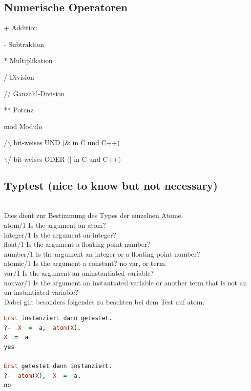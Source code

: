\subsection{Numerische Operatoren}

+     Addition

-     Subtraktion

*     Multiplikation

/     Division    

//    Ganzahl-Division

**    Potenz

mod   Modulo

/$\backslash$    bit-weises UND   (\& in C und C++)

$\backslash$/    bit-weises ODER  (| in C und C++)


\subsection{Typtest (nice to know but not necessary)}\qquad\\
Dies dient zur Bestimmung des Types der einzelnen Atome.\\
atom/1 	Is the argument an atom?\\
integer/1 	Is the argument an integer?\\
float/1 	Is the argument a floating point number?\\
number/1 	Is the argument an integer or a floating point number?\\
atomic/1 	Is the argument a constant? no var, or term. \\
var/1 	Is the argument an uninstantiated variable?\\
nonvar/1 	Is the argument an instantiated variable or another term that is not an un instantiated variable? \\
Dabei gilt besonders folgendes zu beachten bei dem Test auf atom. \\

\begin{lstlisting}[language=Prolog] 
Erst instanziert dann getestet. 
?-  X  =  a,  atom(X).
X  =  a
yes

Erst getestet dann instanziert. 
?-  atom(X),  X  =  a.
no 
\end{lstlisting}
